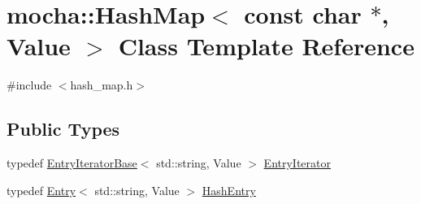 \hypertarget{classmocha_1_1_hash_map_3_01const_01char_01_5_00_01_value_01_4}{
\section{mocha::HashMap$<$ const char $\ast$, Value $>$ Class Template Reference}
\label{classmocha_1_1_hash_map_3_01const_01char_01_5_00_01_value_01_4}
}


{\ttfamily \#include $<$hash\_\-map.h$>$}

\subsection*{Public Types}
\begin{DoxyCompactItemize}
\item 
typedef \hyperlink{classmocha_1_1_entry_iterator_base}{EntryIteratorBase}$<$ std::string, Value $>$ \hyperlink{classmocha_1_1_hash_map_3_01const_01char_01_5_00_01_value_01_4_a6d4fd42742e1f425da11c48b752a071a}{EntryIterator}
\item 
typedef \hyperlink{classmocha_1_1_entry}{Entry}$<$ std::string, Value $>$ \hyperlink{classmocha_1_1_hash_map_3_01const_01char_01_5_00_01_value_01_4_ae5c98db165f1b1bcfa42839abf6c3724}{HashEntry}
\end{DoxyCompactItemize}
